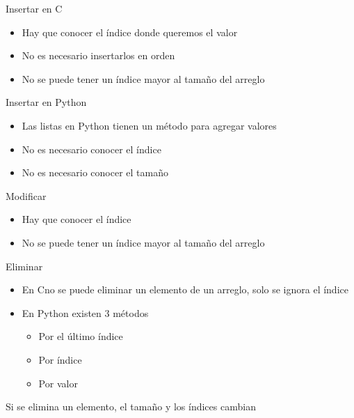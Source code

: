 \documentclass{beamer}
\newcommand{\Rplus}{\protect\hspace{-.1em}\protect\raisebox{.35ex}{\smaller{\smaller\textbf{+}}}}
\newcommand{\Cpp}{\mbox{C\Rplus\Rplus}\hspace{3pt}}
\begin{document}
\begin{frame}{Insertar en \Cpp}
	\begin{itemize}
		\item Hay que conocer el \'indice donde queremos el valor
		\item No es necesario insertarlos en orden
		\item No se puede tener un \'indice mayor al tamaño del arreglo
	\end{itemize}
	\centering
\end{frame}

\begin{frame}{Insertar en Python}
	\begin{itemize}
		\item Las listas en Python tienen un m\'etodo para agregar valores
		\item No es necesario conocer el \'indice
		\item No es necesario conocer el tamaño 
	\end{itemize}
\end{frame}

\begin{frame}{Modificar}
	\begin{itemize}
		\item Hay que conocer el \'indice
		\item No se puede tener un \'indice mayor al tamaño del arreglo
	\end{itemize}
\end{frame}

\begin{frame}{Eliminar}
	\begin{itemize}
		\item En \Cpp no se puede eliminar un elemento de un arreglo, solo se ignora el \'indice
		\item En Python existen 3 m\'etodos
		\begin{itemize}
			\item Por el \'ultimo \'indice
			\item Por \'indice
			\item Por valor
		\end{itemize}
	\end{itemize}
	\item Si se elimina un elemento, el tamaño y los \'indices cambian
\end{frame}
\end{document}
